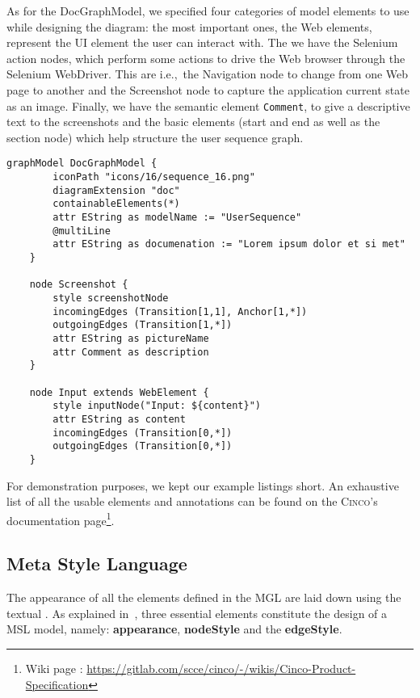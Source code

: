 As for the DocGraphModel, we specified four categories of model elements to use while designing the diagram: the most important ones, the Web elements, represent the UI element the user can interact with. The we have the Selenium action nodes, which perform some actions to drive the Web browser through the Selenium WebDriver. This are i.e.,~the Navigation node to change from one Web page to another and the Screenshot node to capture the application current state as an image. Finally, we have the semantic element \lstinline{Comment}, to give a descriptive text to the screenshots and the basic elements (start and end as well as the section node) which help structure the user sequence graph.

\begin{lstlisting}[language=MGL, caption={Excerpt from the Doc.mgl, meta-specification of the DocGraphModel}, label=featMGL, escapechar=|]
    graphModel DocGraphModel {
        iconPath "icons/16/sequence_16.png"
        diagramExtension "doc"
        containableElements(*)
        attr EString as modelName := "UserSequence"
        @multiLine
        attr EString as documenation := "Lorem ipsum dolor et si met"
    }
    
    node Screenshot {
        style screenshotNode
        incomingEdges (Transition[1,1], Anchor[1,*])
        outgoingEdges (Transition[1,*])
        attr EString as pictureName
        attr Comment as description
    }

    node Input extends WebElement {
        style inputNode("Input: ${content}")
        attr EString as content
        incomingEdges (Transition[0,*])
        outgoingEdges (Transition[0,*])
    }
\end{lstlisting}

For demonstration purposes, we kept our example listings short. An exhaustive list of all the usable elements and annotations can be found on the \textsc{Cinco}'s documentation page\footnote[1]{Wiki page : \url{https://gitlab.com/scce/cinco/-/wikis/Cinco-Product-Specification}}.

\subsection{Meta Style Language}\label{sec:MSL}

The appearance of all the elements defined in the MGL are laid down using the textual . As explained in~\cite{gitlabcinco}, three essential elements constitute the design of a MSL model, namely: \textbf{appearance}, \textbf{nodeStyle} and the \textbf{edgeStyle}.


